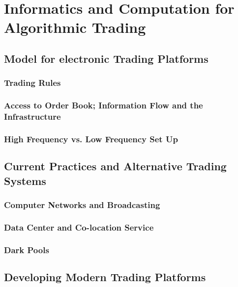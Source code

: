 
\chapter{Informatics and Computation for Algorithmic Trading}

\section{Model for electronic Trading Platforms}
\subsection{Trading Rules}
\subsection{Access to Order Book; Information Flow and the Infrastructure}
\subsection{High Frequency vs. Low Frequency Set Up}
\section{Current Practices and Alternative Trading Systems}
\subsection{Computer Networks and Broadcasting}
\subsection{Data Center and Co-location Service}
\subsection{Dark Pools}
\section{Developing Modern Trading Platforms}
